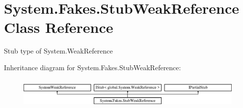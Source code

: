 \hypertarget{class_system_1_1_fakes_1_1_stub_weak_reference}{\section{System.\-Fakes.\-Stub\-Weak\-Reference Class Reference}
\label{class_system_1_1_fakes_1_1_stub_weak_reference}
}


Stub type of System.\-Weak\-Reference 


Inheritance diagram for System.\-Fakes.\-Stub\-Weak\-Reference\-:\begin{figure}[H]
\begin{center}
\leavevmode
\includegraphics[height=1.530055cm]{class_system_1_1_fakes_1_1_stub_weak_reference}
\end{center}
\end{figure}
